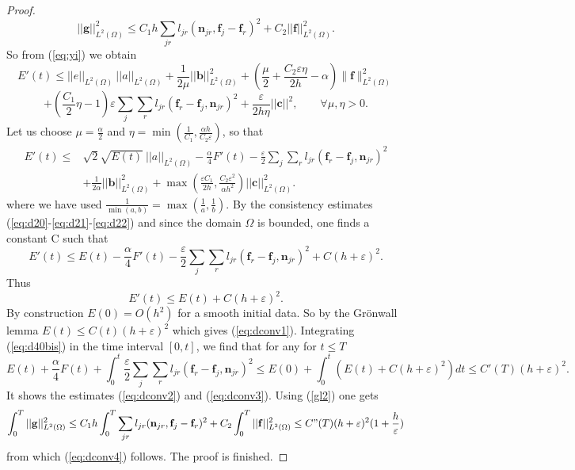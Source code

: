 \documentclass[a4paper,french,english,10pt]{article}
\newcommand\ljr{l_{jr}}
\newcommand\njr{\mathbf{n}_{jr}}
\newcommand\eps{\varepsilon}
\newcommand\fj{\mathbf{f}_j}
\newcommand\fr{\mathbf{f}_r}
\newcommand\cc{\mathbf{c}}
\newcommand\bb{\mathbf{b}}
\newcommand\ff{\mathbf{f}}
\newcommand\gf{\mathbf{g}}
\begin{document}
\begin{proof}
\begin{equation}\label{gl2}
\vert\vert\gf \vert\vert^2_{L^2(\Omega)} \leq 
C_1 h\sum_{jr}\ljr(\njr,\fj-\fr)^2 +  C_2\vert\vert\ff \vert\vert^2_{L^2(\Omega)}.
\end{equation}
So from (\ref{eq:yi}) we  obtain 
$$
E'(t) \leq  ||e||_{L^2(\Omega)}\ ||a||_{L^2(\Omega)} +
 \frac{1}{2\mu} ||\bb||^2_{L^2(\Omega)} 
+( \frac{\mu}{2} +\frac{C_2\eps\eta}{2h}- \alpha) \|  \ff \|^2_{L^2(\Omega)}
$$
$$
+ (\frac{C_1}{2}\eta -1)\eps\sum_j\sum_r \ljr \left( \fr- \fj,  \njr\right )^2 
+\frac{\eps}{2h\eta} ||\cc||^2, \qquad \forall \mu,\eta >0.
$$
Let us choose $\mu=\frac{\alpha}{2}$ and $\eta =\min(\frac{1}{C_1},\frac{\alpha h}{C_2
\eps})$, so that
\begin{equation*} \label{eq:d40}
\begin{aligned}
E'(t) \leq & \sqrt{2}\sqrt{E(t)}\ ||a||_{L^2(\Omega)}  - \frac{\alpha}{4}  F'(t)
- \frac{\eps}{2}\sum_j\sum_r \ljr \left( \fr- \fj,  \njr\right )^2\\
& +  \frac{1}{2 \alpha} ||\bb||^2_{L^2(\Omega)} +\max(\frac{\eps C_1}{2h},\frac{C_2
\eps^2}{\alpha h^2}) ||\cc||^2_{L^2(\Omega)} .
\end{aligned}
\end{equation*}
where we have used  $\frac1{\min(a,b)}=\max(\frac1a, \frac1b)$.
By the consistency estimates (\ref{eq:d20}-\ref{eq:d21}-\ref{eq:d22}) 
 and since the domain $\Omega$ is bounded, one finds a constant C such that
\begin{equation} \label{eq:d40bis}
E'(t) \leq  E(t)  - \frac{\alpha}{4}  F'(t)
- \frac{\eps}{2}\sum_j\sum_r \ljr \left( \fr- \fj,  \njr\right )^2
+  C\left (h+\eps\right )^2. 
\end{equation}
Thus 
$$
E'(t) \leq  E(t)  
+  C\left (h+\eps\right )^2. 
$$
By construction $E(0)=O(h^2)$ for a smooth initial data.
 So by the Gr\"onwall lemma 
$
E(t)\leq C(t) (h+\eps)^2
$
which gives (\ref{eq:dconv1}).
Integrating  (\ref{eq:d40bis}) in the time interval $[0,t]$,  we find that for any 
for $t\leq T$
$$
E(t)+  \frac{\alpha}{4}  F(t)+\int_0^t \frac{\eps}{2}\sum_j\sum_r \ljr \left(
\fr- \fj,  \njr\right )^2
\leq
 E(0)+ \int_0^t \left(  E(t)+ C(h+\eps)^2  \right) dt \leq C'(T) (h+\eps)^2.
$$
It shows   
the  estimates (\ref{eq:dconv2}) and (\ref{eq:dconv3}).
Using   (\ref{gl2}) 
one gets
\begin{equation*}\label{gl3}
\int_0^T \vert\vert\gf \vert\vert^2_{L^2(\Omega)} \leq 
C_1 h\int_0^T\sum_{jr}\ljr(\njr,\fj-\fr)^2 +  C_2\int_0^T\vert\vert\ff \vert\vert^2_{L^2(\Omega)}\leq
C"(T)(h+\eps)^2(1+\frac h\eps)
\end{equation*}
from which (\ref{eq:dconv4}) follows.
The proof is finished.
\end{proof}
\end{document}
